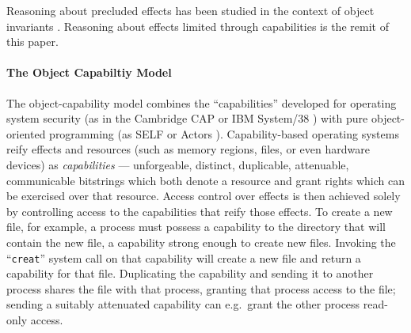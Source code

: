  \vspace{.1cm}
 
\noindent
Reasoning about precluded effects %
has been studied in the context of object invariants   \cite{staticsfull,DrossoFrancaMuellerSummers08,BarDelFahLeiSch04,objInvars,MuellerPoetzsch-HeffterLeavens06}. 
Reasoning about effects limited  through capabilities is the remit of this paper.
  
 


 
 
\paragraph{The Object Capabiltiy Model} 


The object-capability model combines the ``capabilities'' developed
for operating system security (as in the Cambridge CAP or IBM
System/38 \cite{levy:capabilities,CAP}) with pure object-oriented
programming (as SELF or Actors
\cite{selfpower,selfexp95,agha_actors_1987}).  Capability-based
operating systems reify effects and resources (such as memory regions,
files, or even hardware devices) as \textit{capabilities} ---
unforgeable, distinct, duplicable, attenuable, communicable bitstrings
which both denote a resource and grant rights which can be exercised
over that resource. Access control over effects is then achieved
solely by controlling access to the capabilities that reify those
effects. To create a new file, for example, a process must possess a
capability to the directory that will contain the new file, a
capability strong enough to create new files. Invoking the
``\texttt{creat}'' system call \cite{Kern84a} on that capability will
create a new file and return a capability for that file.  Duplicating
the capability and sending it to another process shares the file with
that process, granting that process access to the file; sending a suitably
attenuated capability can e.g.\ grant the other process read-only
access.


